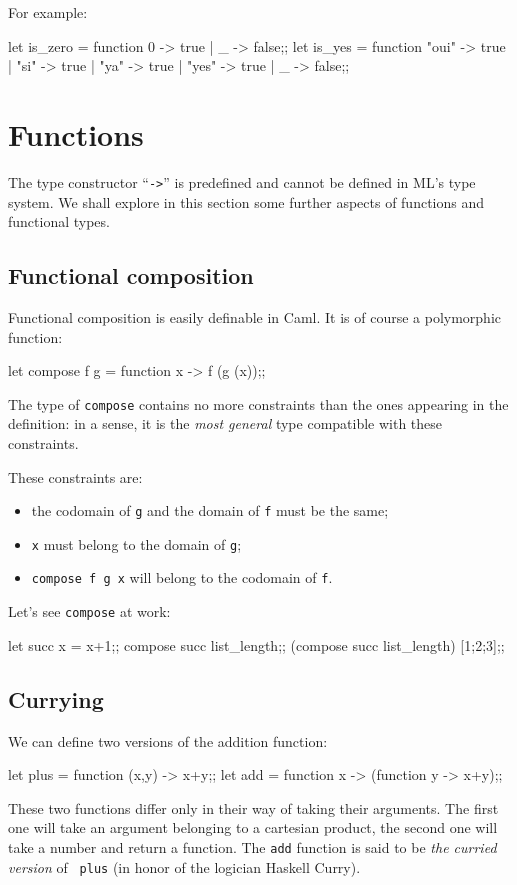 For example:
\begin{caml_example}
let is_zero = function 0 -> true | _ -> false;;
let is_yes = function "oui" -> true
                    | "si" -> true
                    | "ya" -> true
                    | "yes" -> true
                    | _ -> false;;
\end{caml_example}

\section{Functions}

The type constructor ``\verb"->"'' is predefined and cannot be defined
in ML's type system.
We shall explore in this section some further aspects of functions
and functional types.

\subsection{Functional composition}

Functional composition is easily definable in Caml. It is of course a
polymorphic function:
\begin{caml_example}
let compose f g = function x -> f (g (x));;
\end{caml_example}
The type of {\tt compose} contains no more constraints than the ones
appearing in the definition: in a sense, it is the {\em most general} type
compatible with these constraints.

These constraints are:
\begin{itemize}
\item the codomain of {\tt g} and the domain of {\tt f} must be the same;
\item {\tt x} must belong to the domain of {\tt g};
\item {\tt compose f g x} will belong to the codomain of {\tt f}.
\end{itemize}


Let's see \verb"compose" at work:
\begin{caml_example}
let succ x = x+1;;
compose succ list_length;;
(compose succ list_length) [1;2;3];;
\end{caml_example}

\subsection{Currying}
We can define two versions of the addition function:
\begin{caml_example}
let plus = function (x,y) -> x+y;;
let add = function x -> (function y -> x+y);;
\end{caml_example}
These two functions differ only in their way of taking their arguments.
The first one will take an argument belonging to a cartesian product,
the second one will take a number and return a function.
The {\tt add} function is said to be {\em the curried version} of {\tt
plus} (in honor of the logician Haskell Curry).


